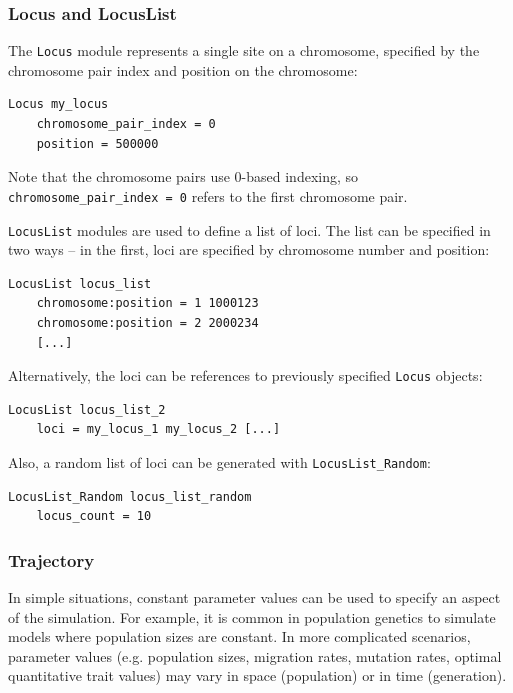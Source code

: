 \documentclass{article}
\begin{document}
\subsubsection{Locus and LocusList}

The \texttt{Locus} module represents a single site on a chromosome, specified
by the chromosome pair index and position on the chromosome:

\begin{small}
\begin{verbatim}
Locus my_locus
    chromosome_pair_index = 0
    position = 500000
\end{verbatim}
\end{small}

Note that the chromosome pairs use 0-based indexing, so \texttt{chromosome\_pair\_index = 0}
refers to the first chromosome pair.

\texttt{LocusList} modules are used to define a list of loci.  The list can be specified
in two ways -- in the first, loci are specified by chromosome number and position:
\begin{small}
\begin{verbatim}
LocusList locus_list
    chromosome:position = 1 1000123
    chromosome:position = 2 2000234
    [...]
\end{verbatim}
\end{small}

Alternatively, the loci can be references to previously specified \texttt{Locus} objects:
\begin{small}
\begin{verbatim}
LocusList locus_list_2
    loci = my_locus_1 my_locus_2 [...]
\end{verbatim}
\end{small}

Also, a random list of loci can be generated with \texttt{LocusList\_Random}:
\begin{small}
\begin{verbatim}
LocusList_Random locus_list_random
    locus_count = 10
\end{verbatim}
\end{small}


\subsubsection{Trajectory}

In simple situations, constant parameter values can be used to specify an
aspect of the simulation.  For example, it is common in population genetics to
simulate models where population sizes are constant.  In more complicated
scenarios, parameter values (e.g. population sizes, migration rates, mutation
rates, optimal quantitative trait values) may vary in space (population) or in
time (generation).
\end{document}
